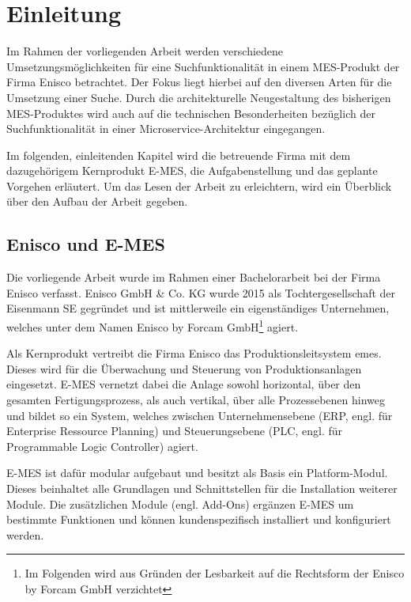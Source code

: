 \chapter{Einleitung\label{chap1:Erstes-Kapitel}}

Im Rahmen der vorliegenden Arbeit werden verschiedene Umsetzungsmöglichkeiten für eine Suchfunktionalität in einem MES-Produkt der Firma Enisco betrachtet. Der Fokus liegt hierbei auf den diversen Arten für die Umsetzung einer Suche. Durch die architekturelle Neugestaltung des bisherigen MES-Produktes wird auch auf die technischen Besonderheiten bezüglich der Suchfunktionalität in einer Microservice-Architektur eingegangen.

Im folgenden, einleitenden Kapitel wird die betreuende Firma mit dem dazugehörigem Kernprodukt E-MES, die Aufgabenstellung und das geplante Vorgehen erläutert. Um das Lesen der Arbeit zu erleichtern, wird ein Überblick über den Aufbau der Arbeit gegeben.

\section{Enisco und E-MES\label{sec1.1:unterpunkt-1}}

Die vorliegende Arbeit wurde im Rahmen einer Bachelorarbeit bei der Firma Enisco verfasst. Enisco GmbH \& Co. KG wurde 2015 als Tochtergesellschaft der Eisenmann SE gegründet und ist mittlerweile ein eigenständiges Unternehmen, welches unter dem Namen \glqq Enisco by Forcam GmbH\footnote{Im Folgenden wird aus Gründen der Lesbarkeit auf die Rechtsform der Enisco by Forcam GmbH verzichtet}\grqq{} agiert.

Als Kernprodukt vertreibt die Firma Enisco das Produktionsleitsystem \glqq \gls{emes}\grqq{}. Dieses wird für die Überwachung und Steuerung von Produktionsanlagen eingesetzt. E-MES vernetzt dabei die Anlage sowohl horizontal, über den gesamten Fertigungsprozess, als auch vertikal, über alle Prozessebenen hinweg und bildet so ein System, welches zwischen Unternehmensebene (ERP, engl. für Enterprise Ressource Planning) und Steuerungsebene (PLC, engl. für Programmable Logic
Controller) agiert. \cite{EniscobyForcamGmbH.2021b}

E-MES ist dafür modular aufgebaut und besitzt als Basis ein Platform-Modul. Dieses beinhaltet alle Grundlagen und Schnittstellen für die Installation weiterer Module. Die zusätzlichen Module (engl. Add-Ons) ergänzen E-MES um bestimmte Funktionen und können kundenspezifisch installiert und konfiguriert werden.

